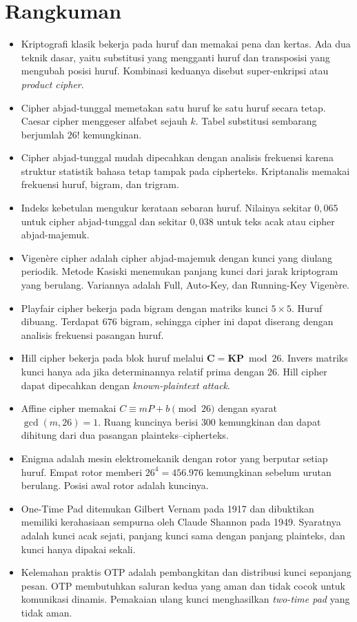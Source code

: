 \section{Rangkuman}
\begin{itemize}
    \item Kriptografi klasik bekerja pada huruf dan memakai pena dan kertas. Ada dua teknik dasar, yaitu substitusi yang mengganti huruf dan transposisi yang mengubah posisi huruf. Kombinasi keduanya disebut super-enkripsi atau \textit{product cipher}.
    \item Cipher abjad-tunggal memetakan satu huruf ke satu huruf secara tetap. Caesar cipher menggeser alfabet sejauh $k$. Tabel substitusi sembarang berjumlah $26!$ kemungkinan.
    \item Cipher abjad-tunggal mudah dipecahkan dengan analisis frekuensi karena struktur statistik bahasa tetap tampak pada cipherteks. Kriptanalis memakai frekuensi huruf, bigram, dan trigram.
    \item Indeks kebetulan mengukur kerataan sebaran huruf. Nilainya sekitar $0{,}065$ untuk cipher abjad-tunggal dan sekitar $0{,}038$ untuk teks acak atau cipher abjad-majemuk.
    \item Vigen\`ere cipher adalah cipher abjad-majemuk dengan kunci yang diulang periodik. Metode Kasiski menemukan panjang kunci dari jarak kriptogram yang berulang. Variannya adalah Full, Auto-Key, dan Running-Key Vigen\`ere.
    \item Playfair cipher bekerja pada bigram dengan matriks kunci $5 \times 5$. Huruf  dibuang. Terdapat $676$ bigram, sehingga cipher ini dapat diserang dengan analisis frekuensi pasangan huruf.
    \item Hill cipher bekerja pada blok huruf melalui $\mathbf{C}=\mathbf{KP} \bmod 26$. Invers matriks kunci hanya ada jika determinannya relatif prima dengan 26. Hill cipher dapat dipecahkan dengan \textit{known-plaintext attack}.
    \item Affine cipher memakai $C \equiv mP+b \pmod{26}$ dengan syarat $\gcd(m,26)=1$. Ruang kuncinya berisi $300$ kemungkinan dan dapat dihitung dari dua pasangan plainteks--cipherteks.
    \item Enigma adalah mesin elektromekanik dengan rotor yang berputar setiap huruf. Empat rotor memberi $26^4=456.976$ kemungkinan sebelum urutan berulang. Posisi awal rotor adalah kuncinya.
    \item One-Time Pad ditemukan Gilbert Vernam pada 1917 dan dibuktikan memiliki kerahasiaan sempurna oleh Claude Shannon pada 1949. Syaratnya adalah kunci acak sejati, panjang kunci sama dengan panjang plainteks, dan kunci hanya dipakai sekali.
    \item Kelemahan praktis OTP adalah pembangkitan dan distribusi kunci sepanjang pesan. OTP membutuhkan saluran kedua yang aman dan tidak cocok untuk komunikasi dinamis. Pemakaian ulang kunci menghasilkan \textit{two-time pad} yang tidak aman.
\end{itemize}

